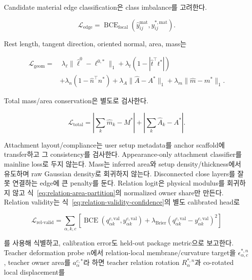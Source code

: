 \documentclass[11pt,a4paper]{article}
\begin{document}
Candidate material edge classification은 class imbalance를 고려한다.

\begin{equation}
  \mathcal L_{\mathrm{edge}}
  =
  \operatorname{BCE}_{\mathrm{focal}}
  (\widehat y_{ij}^{\mathrm{mat}},y_{ij}^{*,\mathrm{mat}}).
\end{equation}

Rest length, tangent direction, oriented normal, area, mass는

\begin{equation}
\begin{aligned}
  \mathcal L_{\mathrm{geom}}
  =&\;
  \lambda_\ell\|\widehat\ell^0-\ell^{0,*}\|_1
  +\lambda_t(1-|\widehat t^\top t^*|)\\
  &+\lambda_n(1-\widehat n^\top n^*)
  +\lambda_A\|\widehat A-A^*\|_1
  +\lambda_m\|\widehat m-m^*\|_1.
\end{aligned}
\end{equation}

Total mass/area conservation은 별도로 검사한다.

\begin{equation}
  \mathcal L_{\mathrm{total}}
  =
  \left|
  \sum_k\widehat m_k-M^*
  \right|
  +
  \left|
  \sum_k\widehat A_k-A^*
  \right|.
\end{equation}

Attachment layout/compliance는 user setup metadata를 anchor scaffold에 transfer하고
그 consistency를 검사한다. Appearance-only attachment classifier를 mainline loss로 두지 않는다.
Mass는 inferred area와 setup density/thickness에서 유도하며 raw Gaussian density로 회귀하지 않는다.
Disconnected close layers를 잘못 연결하는 edge에 큰 penalty를 둔다.
Relation logit은 physical modulus를 회귀하지 않고
식~\eqref{eq:relation-area-partition}의 normalized owner share만 만든다.
Relation validity는 식~\eqref{eq:relation-validity-confidence}의 별도 calibrated head로

\begin{equation}
  \mathcal L_{\mathrm{rel\mbox{-}valid}}
  =
  \sum_{\alpha,k,c}
  \left[
    \operatorname{BCE}(q_{\alpha k}^{c,\mathrm{val}},y_{\alpha k}^{c,\mathrm{val}})
    +\lambda_{\mathrm{Brier}}
    (q_{\alpha k}^{c,\mathrm{val}}-y_{\alpha k}^{c,\mathrm{val}})^2
  \right]
  \label{eq:relation-validity-loss}
\end{equation}

를 사용해 식별하고, calibration error도 held-out package metric으로 보고한다.
Teacher deformation probe \(n\)에서 relation-local membrane/curvature target을
\(\epsilon_{\alpha,c}^{*,n}\), teacher owner area를 \(a_\alpha^{c,*}\)라 하면
teacher relation rotation \(R_\alpha^{*,n}\)과 co-rotated local displacement를
\end{document}
